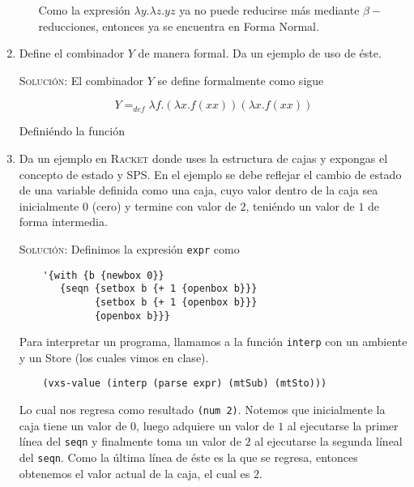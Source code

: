 \documentclass[letterpaper,11pt]{article}
\begin{document}
\begin{enumerate}
\begin{itemize}
        Como la expresión $\lambda y.\lambda z.yz$ ya no puede reducirse más 
        mediante $\beta -$reducciones, entonces ya se encuentra en Forma Normal.
    \end{itemize}

    \item Define el combinador $Y$ de manera formal. Da un ejemplo de uso de 
    éste.

    \textsc{Solución:} El combinador $Y$ se define formalmente como sigue 

    \begin{equation*}
        Y =_{def} \lambda f.(\lambda x.f (xx)) (\lambda x.f (xx))
    \end{equation*}

    Definiéndo la función 

    \item Da un ejemplo en \textsc{Racket} donde uses la estructura de cajas y
    expongas el concepto de estado y SPS. En el ejemplo se debe reflejar el 
    cambio de estado de una variable definida como una caja, cuyo valor dentro 
    de la caja sea inicialmente $0$ (cero) y termine con valor de $2$, teniéndo 
    un valor de $1$ de forma intermedia.

    \textsc{Solución:} Definimos la expresión \texttt{expr} como 
    \begin{verbatim}
    '{with {b {newbox 0}}
       {seqn {setbox b {+ 1 {openbox b}}}
             {setbox b {+ 1 {openbox b}}}
             {openbox b}}}
    \end{verbatim}
    
    Para interpretar un programa, llamamos a la función \texttt{interp} 
    con un ambiente y un Store (los cuales vimos en clase).
    \begin{verbatim}
    (vxs-value (interp (parse expr) (mtSub) (mtSto)))
    \end{verbatim}

    Lo cual nos regresa como resultado \texttt{(num 2)}. Notemos que inicialmente
    la caja tiene un valor de $0$, luego adquiere un valor de $1$ al ejecutarse 
    la primer línea del \texttt{seqn} y finalmente toma un valor de $2$ al 
    ejecutarse la segunda líneal del \texttt{seqn}. Como la última línea de 
    éste es la que se regresa, entonces obtenemos el valor actual de la caja, 
    el cual es $2$.
\end{enumerate}
\end{document}
